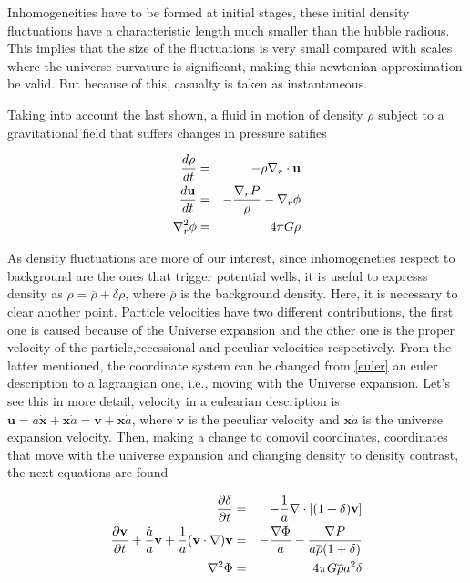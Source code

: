 Inhomogeneities have to be formed at initial stages, these initial density fluctuations 
have a characteristic length much smaller than the hubble radious. This implies that the
size of the fluctuations is very small compared with scales where the universe curvature 
is significant, making this newtonian approximation be valid. But because of this, casualty 
is taken as instantaneous. 

Taking into account the last shown, a fluid in motion of density $\rho$ subject to 
a gravitational field that suffers changes in pressure satifies 

\begin{eqnarray}
\frac{d \rho}{d t}&=& -\rho \nabla_r\cdot \textbf{u} \nonumber\\
\frac{d \textbf{u}}{d t} &=& -\frac{\nabla_r P}{\rho}-\nabla_r\phi \nonumber\\
\nabla^2_r \phi & =& 4\pi G\rho 
\label{euler}
\end{eqnarray}

As density fluctuations are more of our interest, since inhomogeneties 
respect to background are the ones that trigger potential wells, it is
useful to expresss density as $\rho = \overline{\rho}+\delta\rho$, where
$\overline{\rho}$ is the background density. 
Here, it is necessary to clear another point. Particle velocities have 
two different contributions, the first one is caused because of the Universe
expansion and the other one is the proper velocity of the particle,recessional 
and peculiar velocities respectively. 
From the latter mentioned, the coordinate system can be changed from \ref{euler}
an euler description to a lagrangian one, i.e., moving with the Universe expansion.
Let's see this in more detail, velocity in a eulearian description is 
$\textbf{u}= a\dot{\textbf{x}}+ \textbf{x}\dot{a} = \textbf{v}+\textbf{x}\dot{a}$, 
where $\textbf{v}$ is the peculiar velocity and $\textbf{x}\dot{a}$ is the universe 
expansion velocity. 
Then, making a change to comovil coordinates, coordinates that move with the universe
expansion and changing density to density contrast, the next equations are found

\begin{eqnarray}
\frac{\partial \delta}{\partial t} &=& -\frac{1}{a}\nabla\cdot[(1+\delta)\textbf{v}]\nonumber\\
\frac{\partial \textbf{v}}{\partial t}+\frac{\dot{a}}{a}\textbf{v}+\frac{1}{a}(\textbf{v}\cdot\nabla)\textbf{v}& = &
-\frac{\nabla \Phi}{a}-\frac{\nabla P}{a\overline{\rho}(1+\delta)}\nonumber\\
\nabla^2 \Phi &=& 4\pi G\overline{\rho}a^2\delta
\label{ec.movimiento}
\end{eqnarray}

